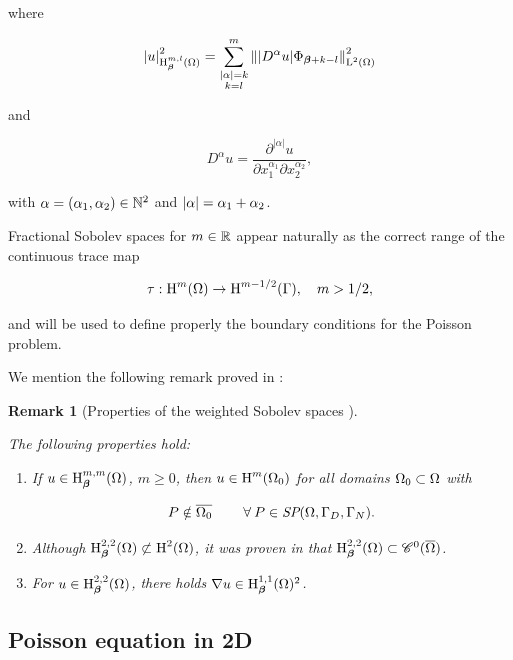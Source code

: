 \documentclass[a4paper,11pt]{article}
\newtheorem{remark}[theorem]{Remark}
\begin{document}
where

$$\left|u\right|^{2}_{\operatorname H^{m,l}_{\boldsymbol \beta}(\Omega)} = \sum_{\substack{|\alpha| = k \\ k=l}}^{m} \left\||D^{\alpha}u| \Phi_{\boldsymbol \beta + k - l}\right\|^{2}_{\operatorname L^{2}(\Omega)}$$

and

$$D^{\alpha}u = \frac{\partial^{|\alpha|} u}{\partial x_{1}^{\alpha_{1}} \partial x_{2}^{\alpha_{2}}},$$


with $\alpha = (\alpha_{1},\alpha_{2}) \in \mathbb N^{2}$ and $\left|\alpha\right| = \alpha_{1} + \alpha_{2}$. 

Fractional Sobolev spaces for $m \in \mathbb R$  appear naturally as the correct range of the continuous trace map

$$ \tau: \operatorname H^{m}(\Omega) \rightarrow \operatorname H^{m - 1/2}(\Gamma), \quad m > 1/2, $$

and will be used to define properly the boundary conditions for the Poisson problem.

We mention the following remark proved in \cite{Wihler:2003}:

\begin{remark}[Properties of the weighted Sobolev spaces {\cite[Remark 1.2.2]{Wihler:2003}}]
\label{remark:properties_sob_spaces}

The following properties hold:

\begin{enumerate}

    \item  If  $u \in \operatorname H^{m,m}_{\boldsymbol \beta}(\Omega)$, $m\geq0$, then $u \in \operatorname H^{m}(\Omega_{0})$ for all domains $\Omega_{0} \subset \Omega$ with
    
    $$ P \notin \overline{\Omega_{0}} \quad  \quad\:\forall\: P \in  \textit{SP}(\Omega,\Gamma_{D},\Gamma_{N}).$$
    
    \item Although $\operatorname H^{2,2}_{\boldsymbol \beta}(\Omega) \not \subset \operatorname H^{2}(\Omega)$, it was proven in \cite{BKP:1979} that $\operatorname H^{2,2}_{\boldsymbol \beta}(\Omega) \subset \mathscr C^{0}(\overline{\Omega})$.
    
    \item For $u \in \operatorname H^{2,2}_{\boldsymbol \beta}(\Omega)$, there holds $\nabla u \in \operatorname H^{1,1}_{\boldsymbol \beta}(\Omega)^{2}$.

\end{enumerate}
    
\end{remark}


\subsection{Poisson equation in 2D}
\end{document}
